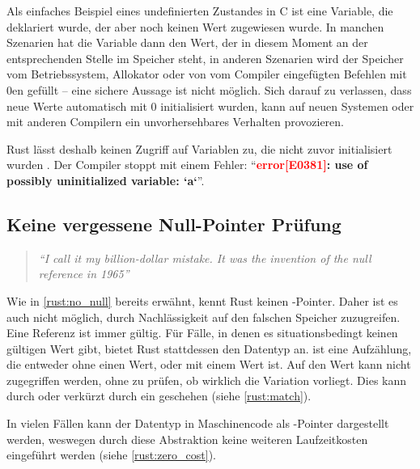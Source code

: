 Als einfaches Beispiel eines undefinierten Zustandes in C ist eine Variable, die deklariert wurde, der aber noch keinen Wert zugewiesen wurde.
In manchen Szenarien hat die Variable dann den Wert, der in diesem Moment an der entsprechenden Stelle im Speicher steht, in anderen Szenarien wird der Speicher vom Betriebssystem, Allokator oder von vom Compiler eingefügten Befehlen mit 0en gefüllt -- eine sichere Aussage ist nicht möglich.
Sich darauf zu verlassen, dass neue Werte automatisch mit 0 initialisiert wurden, kann auf neuen Systemen oder mit anderen Compilern ein unvorhersehbares Verhalten provozieren.

Rust lässt deshalb keinen Zugriff auf Variablen zu, die nicht zuvor initialisiert wurden \cite[126]{rust:orly_programming}.
Der Compiler stoppt mit einem Fehler: \enquote{\textbf{\textcolor{red}{error[E0381]}: use of possibly uninitialized variable: `a`}}.


\subsection{Keine vergessene Null-Pointer Prüfung}
\label{rust:guarantee:no_null}

\begin{quotation}
	\textit{\enquote{I call it my billion-dollar mistake. It was the invention of the null reference in 1965}}
	\cite[Tony Hoare, QCon Software Konferenz in London, 2009]{rust:infoq:null}
\end{quotation}

Wie in \autoref{rust:no_null} bereits erwähnt, kennt Rust keinen -Pointer.
Daher ist es auch nicht möglich, durch Nachlässigkeit auf den falschen Speicher zuzugreifen.
Eine Referenz ist immer gültig.
Für Fälle, in denen es situationsbedingt keinen gültigen Wert gibt, bietet Rust stattdessen den  Datentyp an.
 ist eine Aufzählung, die entweder  ohne einen Wert, oder  mit einem Wert ist.
Auf den Wert kann nicht zugegriffen werden, ohne zu prüfen, ob wirklich die Variation  vorliegt.
Dies kann durch  oder verkürzt durch ein  geschehen (siehe \autoref{rust:match}).

In vielen Fällen kann der  Datentyp in Maschinencode als -Pointer dargestellt werden, weswegen durch diese Abstraktion keine weiteren Laufzeitkosten eingeführt werden \cite[100]{rust:orly_programming} (siehe \autoref{rust:zero_cost}).

